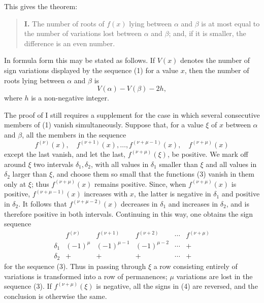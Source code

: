 \documentclass[11pt]{article}
\begin{document}
This gives the theorem:

\begin{quote}
\textbf{I.} The number of roots of $f(x)$ lying between $\alpha$ and $\beta$ is at most equal to the number of variations lost between $\alpha$ and $\beta$; and, if it is smaller, the difference is an even number.
\end{quote}

In formula form this may be stated as follows. If $V(x)$ denotes the number of sign variations displayed by the sequence (1) for a value $x$, then the number of roots lying between $\alpha$ and $\beta$ is
\begin{equation}
        V(\alpha)-V(\beta)-2h,
\tag{2}
\end{equation}
where $h$ is a non-negative integer.

The proof of I still requires a supplement for the case in which several consecutive members of (1) vanish simultaneously. Suppose that, for a value $\xi$ of $x$ between $\alpha$ and $\beta$, all the members in the sequence
\begin{equation}
        f^{(\nu)}(x),\quad f^{(\nu+1)}(x),\ldots,
        f^{(\nu+\mu-1)}(x),\quad f^{(\nu+\mu)}(x)
\tag{3}
\end{equation}
except the last vanish, and let the last, $f^{(\nu+\mu)}(\xi)$, be positive. We mark off around $\xi$ two intervals $\delta_1,\delta_2$, with all values in $\delta_1$ smaller than $\xi$ and all values in $\delta_2$ larger than $\xi$, and choose them so small that the functions (3) vanish in them only at $\xi$; thus $f^{(\nu+\mu)}(x)$ remains positive. Since, when $f^{(\nu+\mu)}(x)$ is positive, $f^{(\nu+\mu-1)}(x)$ increases with $x$, the latter is negative in $\delta_1$ and positive in $\delta_2$. It follows that $f^{(\nu+\mu-2)}(x)$ decreases in $\delta_1$ and increases in $\delta_2$, and is therefore positive in both intervals. Continuing in this way, one obtains the sign sequence
\[
\begin{array}{c|ccccc}
& f^{(\nu)} & f^{(\nu+1)} & f^{(\nu+2)} & \cdots & f^{(\nu+\mu)}\\ \hline
\delta_1&(-1)^\mu&(-1)^{\mu-1}&(-1)^{\mu-2}&\cdots&+\\
\delta_2&+&+&+&\cdots&+
\end{array}
\tag{4}
\]
for the sequence (3). Thus in passing through $\xi$ a row consisting entirely of variations is transformed into a row of permanences; $\mu$ variations are lost in the sequence (3). If $f^{(\nu+\mu)}(\xi)$ is negative, all the signs in (4) are reversed, and the conclusion is otherwise the same.
\end{document}
